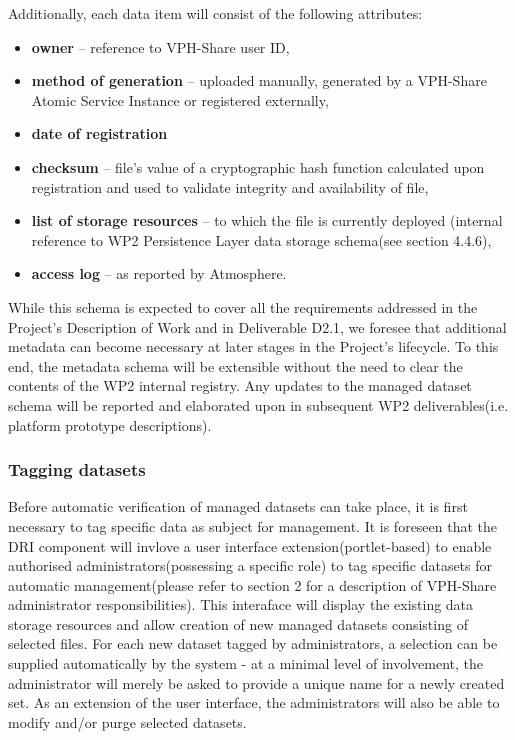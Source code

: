 \documentclass[a4paper,12pt,titlepage]{article}
\begin{document}
\noindent
Additionally, each data item will consist of the following attributes:

\begin{itemize}
\item \textbf{owner} -- reference to VPH-Share user ID,
\item \textbf{method of generation} -- uploaded manually, generated by a VPH-Share Atomic Service Instance or registered externally,
\item \textbf{date of registration}
\item \textbf{checksum} -- file's value of a cryptographic hash function calculated upon registration and used to validate integrity and availability of file,
\item \textbf{list of storage resources} -- to which the file is currently deployed (internal reference to WP2 Persistence Layer data storage schema(see section 4.4.6),
\item \textbf{access log} -- as reported by Atmosphere.
\end{itemize}

\noindent
While this schema is expected to cover all the requirements addressed in the Project's Description of Work and in Deliverable D2.1, we foresee that additional metadata can become necessary at later stages in the Project's lifecycle. To this end, the metadata schema will be extensible without the need to clear the contents of the WP2 internal registry. Any updates to the managed dataset schema will be reported and elaborated upon in subsequent WP2 deliverables(i.e. platform prototype descriptions).

\subsubsection{Tagging datasets}
Before automatic verification of managed datasets can take place, it is first necessary to tag specific data as subject for management. It is foreseen that the DRI component will invlove a user interface extension(portlet-based) to enable authorised administrators(possessing a specific role) to tag specific datasets for automatic management(please refer to section 2 for a description of VPH-Share administrator responsibilities). This interaface will display the existing data storage resources and allow creation of new managed datasets consisting of selected files. For each new dataset tagged by administrators, a selection can be supplied automatically by the system - at a minimal level of involvement, the administrator will merely be asked to provide a unique name for a newly created set. As an extension of the user interface, the administrators will also be able to modify and/or purge selected datasets.\\
\end{document}
